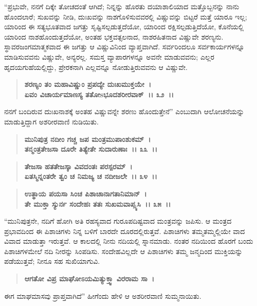 “ಪ್ರಭುವೇ, ನನಗೆ ದಿಕ್ಕೇ ತೋಚದಂತೆ ಆಗಿದೆ; ನಿನ್ನನ್ನು ಹೊರತು ದಯಾಶಾಲಿಯಾದ ಮತ್ತೊಬ್ಬನನ್ನು ನಾನು ಹೊಂದಲಾರೆ; ಸುಖವನ್ನು ನೀಡಿ, ದುಃಖವನ್ನು ನಾಶಗೊಳಿಸುವವರಲ್ಲಿ ವಿಷ್ಣುವನ್ನು ಬಿಟ್ಟರೆ ಮತ್ತೆ ಯಾರೂ ಇಲ್ಲ; ಯಾರಿಂದ ಈ ಸತ್ಯಭೂತವಾದ ಜಗತ್ತು ಸೃಷ್ಟಿಸಲ್ಪಡುತ್ತದೆಯೋ, ಯಾರಿಂದ ರಕ್ಷಿಸಲ್ಪಡುತ್ತಿದೆಯೋ, ಕೊನೆಯಲ್ಲಿ ಯಾರಿಂದ ನಾಶಹೊಂದುತ್ತದೆಯೋ, ಅಂತಹ ಭಕ್ತವತ್ಸಲನಾದ, ನಾಶರಹಿತನಾದ ವಿಷ್ಣುವೇ ಶರಣ್ಯನು. ಸ್ಥಾವರಜಂಗಮಾತ್ಮಕವಾದ ಈ ಜಗತ್ತು ಆ ವಿಷ್ಣುವಿನಿಂದ ವ್ಯಾಪ್ತವಾಗಿದೆ. ಸರ್ವರಿಂದಲೂ ಸರ್ವಕಾರ್ಯಗಳನ್ನೂ ಮಾಡಿಸುವವನು ವಿಷ್ಣುವೇ, ಅನ್ಯರಲ್ಲ. ಸಮಸ್ತ ವ್ಯಾಪಾರಗಳನ್ನೂ ಅವನೇ ಮಾಡುವವನು; ಎಲ್ಲರ ಹೃದಯಗುಹೆಯಲ್ಲಿದ್ದು, ಪ್ರೇರಕನಾಗಿ ಎಲ್ಲವನ್ನೂ ನೋಡುತ್ತಿರುವವನು ಆ ವಿಷ್ಣುವೇ.

\begin{verse}
\textbf{ಶರಣ್ಯಂ ತಂ ಮಹಾವಿಷ್ಣುಂ ಪ್ರಪದ್ಯೇ ದುಃಖಮುಕ್ತಯೇ~।}\\\textbf{ಏವಂ ವಿಚಾರ್ಯಮಾಣಸ್ಯ ತತೋsಭೂದಶರೀರವಾಕ್~।। ೩೨~।।}
\end{verse}

ನನಗೆ ಬಂದಿರುವ ದುಃಖನಾಶಕ್ಕೆ ಅಂತಹ ವಿಷ್ಣುವನ್ನೇ ಶರಣು ಹೊಂದುತ್ತೇನೆ'' ಎಂಬುದಾಗಿ ಆಲೋಚನೆಯನ್ನು ಮಾಡುತ್ತಿದ್ದಾಗ ಅಶರೀರವಾಣಿ ನುಡಿಯಿತು.

\begin{verse}
\textbf{ಮುನಿಪುತ್ರ ನದೀಂ ಗಚ್ಚ ಜಪ ಮಂತ್ರಮುಪಾಂಶುಕಮ್~।}\\\textbf{ತನ್ಮಂತ್ರತೇಜಸಾ ದೂರೇ ತಿತ್ಯೇತೇ ಸುದಾರುಣಾಃ~।। ೩೩~।। }
\end{verse}

\begin{verse}
\textbf{ತೇಜಸಾ ಹತತೇಜಸ್ಕಾ ವಿವದಂತಃ ಪರಸ್ಪರಮ್~।}\\\textbf{ಏತಸ್ಮಿನ್ನಂತರೇ ತ್ವಂ ಚ ನಿಮಜ್ಯ ಚ ನದೀಜಲೇ~।। ೩೪~।।} 
\end{verse}

\begin{verse}
\textbf{ಉತ್ಥಾಯ ಪಯಸಾ ಸಿಂಚ ಪಿಶಾಚಾನಾಗತಾನಿಮಾನ್~।}\\\textbf{ತೇ ಮುಕ್ತಾ ಸ್ಯುರ್ನ ಸಂದೇಹಃ ತತಃ ಸುಖಮವಾಪ್ಸ್ಯಸಿ~।। ೩೫~।।}
\end{verse}

“ಮುನಿಪುತ್ರನೇ, ನದಿಗೆ ಹೋಗಿ ಅತಿ ರಹಸ್ಯವಾದ ಗುರೂಪದಿಷ್ಟವಾದ ಮಂತ್ರವನ್ನು ಜಪಿಸು. ಆ ಮಂತ್ರದ ಪ್ರಭಾವದಿಂದ ಈ ಪಿಶಾಚಿಗಳು ನಿನ್ನ ಬಳಿಗೆ ಬಾರದೇ ದೂರದಲ್ಲಿರುತ್ತವೆ. ಪಿಶಾಚಿಗಳು ತಮ್ಮತಮ್ಮಲ್ಲಿಯೇ ವಾದ ವಿವಾದ ಮಾಡುತ್ತಾ ಇರುತ್ತವೆ. ಆ ಕಾಲದಲ್ಲಿ ನೀನು ನದಿಯಲ್ಲಿ ಸ್ನಾನಮಾಡು. ನಂತರ ನದಿಯಿಂದ ಹೊರಗೆ ಬಂದು ಪಿಶಾಚಿಗಳಮೇಲೆ ನದಿ ನೀರನ್ನು ಸಿಂಪಡಿಸು. ಸಂದೇಹವಿಲ್ಲದೇ ಆ ಪಿಶಾಚಿಗಳು ತಮ್ಮ ಜನ್ಮದಿಂದ ಮುಕ್ತಿಯನ್ನು ಪಡೆಯುತ್ತವೆ; ನೀನೂ ಸಹ ಸುಖಿಯಾಗುವಿ.

\begin{verse}
\textbf{ಆಗತೋ ವಿಪ್ರ ಮಾಘೋಽಯಮಿತ್ಯುಕ್ತ್ವಾ ವಿರರಾಮ ಸಾ~।}
\end{verse}

ಈಗ ಮಾಘಮಾಸವು ಪ್ರಾಪ್ತವಾಗಿದೆ” ಹೀಗೆಂದು ಹೇಳಿ ಆ ಅಶರೀರವಾಣಿ ಸುಮ್ಮನಾಯಿತು.

